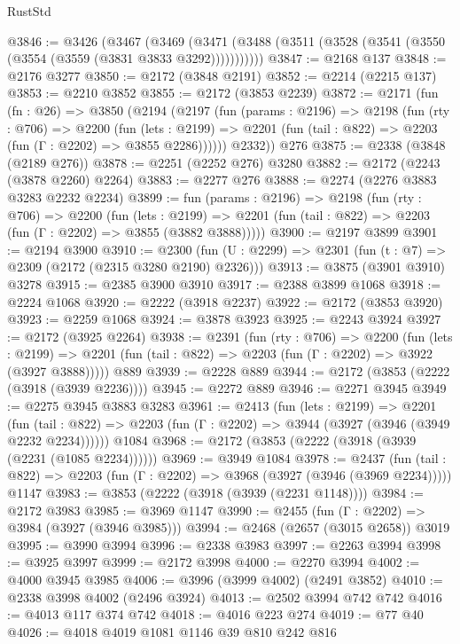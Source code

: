 \begin{lexlean}{RustStd}
\begin{coremodule}
@3846 := @3426
    (@3467
      (@3469 (@3471 (@3488 (@3511 (@3528 (@3541 (@3550 (@3554 (@3559 (@3831 @3833 @3292)))))))))))
@3847 := @2168 @137
@3848 := @2176 @3277
@3850 := @2172 (@3848 @2191)
@3852 := @2214 (@2215 @137)
@3853 := @2210 @3852
@3855 := @2172 (@3853 @2239)
@3872 := @2171
    (fun (fn : @26) =>
    @3850
      (@2194
        (@2197
          (fun (params : @2196) =>
          @2198
            (fun (rty : @706) =>
            @2200
              (fun (lets : @2199) =>
              @2201 (fun (tail : @822) => @2203 (fun (Γ : @2202) => @3855 @2286))))))
        @2332))
    @276
@3875 := @2338 (@3848 (@2189 @276))
@3878 := @2251 (@2252 @276) @3280
@3882 := @2172 (@2243 (@3878 @2260) @2264)
@3883 := @2277 @276
@3888 := @2274 (@2276 @3883 @3283 @2232 @2234)
@3899 := fun (params : @2196) =>
  @2198
    (fun (rty : @706) =>
    @2200
      (fun (lets : @2199) =>
      @2201 (fun (tail : @822) => @2203 (fun (Γ : @2202) => @3855 (@3882 @3888)))))
@3900 := @2197 @3899
@3901 := @2194 @3900
@3910 := @2300 (fun (U : @2299) => @2301 (fun (t : @7) => @2309 (@2172 (@2315 @3280 @2190) @2326)))
@3913 := @3875 (@3901 @3910) @3278
@3915 := @2385 @3900 @3910
@3917 := @2388 @3899 @1068
@3918 := @2224 @1068
@3920 := @2222 (@3918 @2237)
@3922 := @2172 (@3853 @3920)
@3923 := @2259 @1068
@3924 := @3878 @3923
@3925 := @2243 @3924
@3927 := @2172 (@3925 @2264)
@3938 := @2391
    (fun (rty : @706) =>
    @2200
      (fun (lets : @2199) =>
      @2201 (fun (tail : @822) => @2203 (fun (Γ : @2202) => @3922 (@3927 @3888)))))
    @889
@3939 := @2228 @889
@3944 := @2172 (@3853 (@2222 (@3918 (@3939 @2236))))
@3945 := @2272 @889
@3946 := @2271 @3945
@3949 := @2275 @3945 @3883 @3283
@3961 := @2413
    (fun (lets : @2199) =>
    @2201
      (fun (tail : @822) => @2203 (fun (Γ : @2202) => @3944 (@3927 (@3946 (@3949 @2232 @2234))))))
    @1084
@3968 := @2172 (@3853 (@2222 (@3918 (@3939 (@2231 (@1085 @2234))))))
@3969 := @3949 @1084
@3978 := @2437
    (fun (tail : @822) => @2203 (fun (Γ : @2202) => @3968 (@3927 (@3946 (@3969 @2234)))))
    @1147
@3983 := @3853 (@2222 (@3918 (@3939 (@2231 @1148))))
@3984 := @2172 @3983
@3985 := @3969 @1147
@3990 := @2455 (fun (Γ : @2202) => @3984 (@3927 (@3946 @3985)))
@3994 := @2468 (@2657 (@3015 @2658)) @3019
@3995 := @3990 @3994
@3996 := @2338 @3983
@3997 := @2263 @3994
@3998 := @3925 @3997
@3999 := @2172 @3998
@4000 := @2270 @3994
@4002 := @4000 @3945 @3985
@4006 := @3996 (@3999 @4002) (@2491 @3852)
@4010 := @2338 @3998 @4002 (@2496 @3924)
@4013 := @2502 @3994 @742 @742
@4016 := @4013 @117 @374 @742
@4018 := @4016 @223 @274
@4019 := @77 @40
@4026 := @4018 @4019 @1081 @1146 @39 @810 @242 @816

\end{coremodule}
\end{lexlean}
